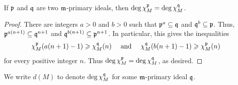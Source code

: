 \begin{proposition}
    If $\mathfrak{p}$ and $\mathfrak{q}$ are two $\mathfrak{m}$-primary ideals, then $\deg\chi_M^{\mathfrak{p}} = \deg\chi_M^{\mathfrak{q}}$.
\end{proposition}
\begin{proof}
    There are integers $a > 0$ and $b > 0$ such that $\mathfrak{p}^a\subseteq\mathfrak{q}$ and $\mathfrak{q}^b\subseteq\mathfrak{p}$. Thus, $\mathfrak{p}^{a(n + 1)}\subseteq\mathfrak{q}^{n + 1}$ and $\mathfrak{q}^{b(n + 1)}\subseteq\mathfrak{p}^{n + 1}$. In particular, this gives the inequalities 
    \begin{equation*}
        \chi^{\mathfrak{p}}_M(a(n + 1) - 1)\geqslant\chi^{\mathfrak{q}}_M(n)\quad\text{ and }\quad\chi^{\mathfrak{q}}_M(b(n + 1) - 1)\geqslant\chi^{\mathfrak{p}}_M(n)
    \end{equation*}
    for every positive integer $n$. Thus $\deg\chi^{\mathfrak{p}}_M = \deg\chi^{\mathfrak{q}}_M$, as desired. 
\end{proof}

\begin{definition}
    We write $d(M)$ to denote $\deg\chi^{\mathfrak{q}}_M$ for some $\mathfrak{m}$-primary ideal $\mathfrak{q}$.
\end{definition}

